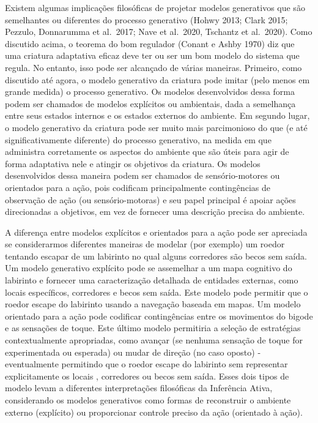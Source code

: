\documentclass[
  12pt,
]{book}
\begin{document}
Existem algumas implicações filosóficas de projetar modelos generativos que são semelhantes ou diferentes do processo generativo (Hohwy 2013; Clark 2015; Pezzulo, Donnarumma et al.~2017; Nave et al.~2020, Tschantz et al.~2020). Como discutido acima, o teorema do bom regulador (Conant e Ashby 1970) diz que uma criatura adaptativa eficaz deve ter ou ser um bom modelo do sistema que regula. No entanto, isso pode ser alcançado de várias maneiras. Primeiro, como discutido até agora, o modelo generativo da criatura pode imitar (pelo menos em grande medida) o processo generativo. Os modelos desenvolvidos dessa forma podem ser chamados de modelos explícitos ou ambientais, dada a semelhança entre seus estados internos e os estados externos do ambiente. Em segundo lugar, o modelo generativo da criatura pode ser muito mais parcimonioso do que (e até significativamente diferente) do processo generativo, na medida em que administra corretamente os aspectos do ambiente que são úteis para agir de forma adaptativa nele e atingir os objetivos da criatura. Os modelos desenvolvidos dessa maneira podem ser chamados de sensório-motores ou orientados para a ação, pois codificam principalmente contingências de observação de ação (ou sensório-motoras) e seu papel principal é apoiar ações direcionadas a objetivos, em vez de fornecer uma descrição precisa do ambiente.

A diferença entre modelos explícitos e orientados para a ação pode ser apreciada se considerarmos diferentes maneiras de modelar (por exemplo) um roedor tentando escapar de um labirinto no qual alguns corredores são becos sem saída. Um modelo generativo explícito pode se assemelhar a um mapa cognitivo do labirinto e fornecer uma caracterização detalhada de entidades externas, como locais específicos, corredores e becos sem saída. Este modelo pode permitir que o roedor escape do labirinto usando a navegação baseada em mapas. Um modelo orientado para a ação pode codificar contingências entre os movimentos do bigode e as sensações de toque. Este último modelo permitiria a seleção de estratégias contextualmente apropriadas, como avançar (se nenhuma sensação de toque for experimentada ou esperada) ou mudar de direção (no caso oposto) - eventualmente permitindo que o roedor escape do labirinto sem representar explicitamente os locais , corredores ou becos sem saída. Esses dois tipos de modelo levam a diferentes interpretações filosóficas da Inferência Ativa, considerando os modelos generativos como formas de reconstruir o ambiente externo (explícito) ou proporcionar controle preciso da ação (orientado à ação).
\end{document}
